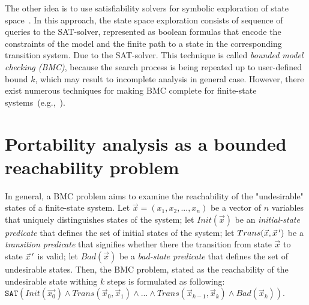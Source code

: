 The other idea is to use satisfiability solvers for symbolic exploration of state space~\cite{clarke2001bounded}. In this approach, the state space exploration consists of sequence of queries to the SAT-solver, represented as boolean formulas that encode the constraints of the model and the finite path to a state in the corresponding transition system.  
Due to the SAT-solver. This technique is called \textit{bounded model checking (BMC)}, because the search process is being repeated up to user-defined bound $k$, which may result to incomplete analysis in general case. However, there exist numerous techniques for making BMC complete for finite-state systems~(e.g.,~\cite{shtrichman2000tuning}).



\section{Portability analysis as a bounded reachability problem}
\label{ch:port:enc}


In general, a BMC problem aims to examine the reachability of the "undesirable" states of a finite-state system. Let $\vec{x} = (x_1, x_2, ..., x_n)$ be a vector of $n$ variables that uniquely distinguishes states of the system; let $Init(\vec{x})$ be an \textit{initial-state predicate} that defines the set of initial states of the system; let $Trans(\vec{x}, \vec{x}\,')$ be a \textit{transition predicate} that signifies whether there the transition from state $\vec{x}$ to state $\vec{x}\,'$ is valid; let $Bad(\vec{x})$ be a \textit{bad-state predicate} that defines the set of undesirable states. Then, the BMC problem, stated as the reachability of the undesirable state withing $k$ steps is formulated as following:
$\mathtt{SAT}( Init(\vec{x_0}) \land Trans(\vec{x}_0, \vec{x}_1) \land ... \land Trans(\vec{x}_{k-1}, \vec{x}_k) \land Bad(\vec{x}_k) )$.

